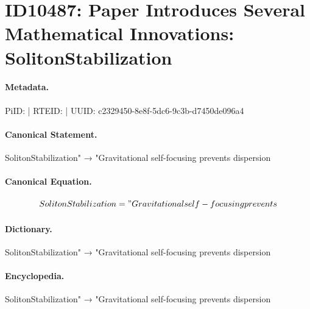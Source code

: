 \section*{ID10487: Paper Introduces Several Mathematical Innovations: SolitonStabilization}
\paragraph{Metadata.}
PiID:  | RTEID:  | UUID: c2329450-8e8f-5dc6-9c3b-d7450de096a4

\paragraph{Canonical Statement.}
SolitonStabilization" → "Gravitational self-focusing prevents dispersion

\paragraph{Canonical Equation.}
\[
SolitonStabilization = "Gravitational self-focusing prevents
\]

\paragraph{Dictionary.}
SolitonStabilization" → "Gravitational self-focusing prevents dispersion

\paragraph{Encyclopedia.}
SolitonStabilization" → "Gravitational self-focusing prevents dispersion
